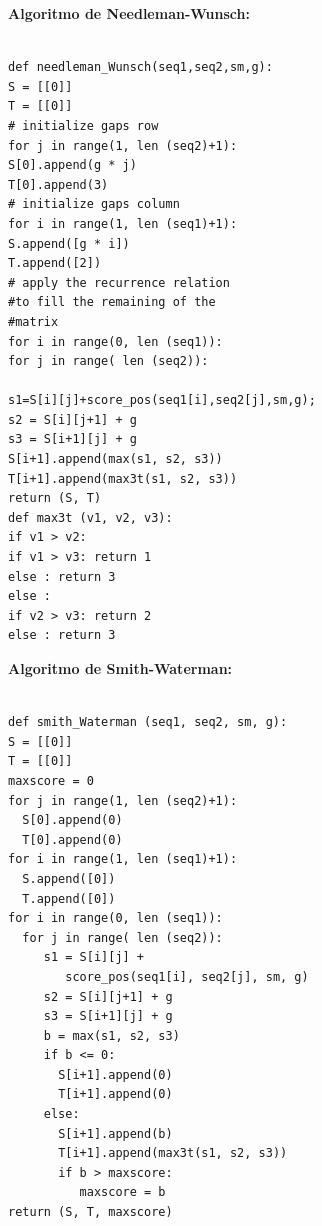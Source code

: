 \documentclass[twocolumn,twoside,12pt]{article}
\begin{document}
\textbf{Algoritmo de Needleman-Wunsch:}
\footnotesize
\begin{lstlisting}[frame=single]

def needleman_Wunsch(seq1,seq2,sm,g):
S = [[0]]
T = [[0]]
# initialize gaps row
for j in range(1, len (seq2)+1):
S[0].append(g * j)
T[0].append(3)
# initialize gaps column
for i in range(1, len (seq1)+1):
S.append([g * i])
T.append([2])
# apply the recurrence relation 
#to fill the remaining of the
#matrix
for i in range(0, len (seq1)):
for j in range( len (seq2)):

s1=S[i][j]+score_pos(seq1[i],seq2[j],sm,g);
s2 = S[i][j+1] + g
s3 = S[i+1][j] + g
S[i+1].append(max(s1, s2, s3))
T[i+1].append(max3t(s1, s2, s3))
return (S, T)
def max3t (v1, v2, v3):
if v1 > v2:
if v1 > v3: return 1
else : return 3
else :
if v2 > v3: return 2
else : return 3

\end{lstlisting}
\normalsize
\textbf{Algoritmo de Smith-Waterman:}
\footnotesize
\begin{lstlisting}[frame=single]

def smith_Waterman (seq1, seq2, sm, g):
S = [[0]]
T = [[0]]
maxscore = 0
for j in range(1, len (seq2)+1):
  S[0].append(0)
  T[0].append(0)
for i in range(1, len (seq1)+1):
  S.append([0])
  T.append([0])
for i in range(0, len (seq1)):
  for j in range( len (seq2)):
     s1 = S[i][j] + 
        score_pos(seq1[i], seq2[j], sm, g)
     s2 = S[i][j+1] + g
     s3 = S[i+1][j] + g
     b = max(s1, s2, s3)
     if b <= 0:
       S[i+1].append(0)
       T[i+1].append(0)
     else:
       S[i+1].append(b)
       T[i+1].append(max3t(s1, s2, s3))
       if b > maxscore:
          maxscore = b
return (S, T, maxscore)

\end{lstlisting}
\normalsize
\end{document}
